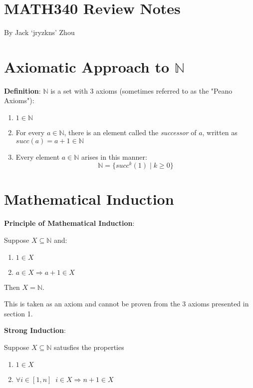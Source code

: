 \documentclass{article}
\begin{document}
\begin{multicols*}{2}

\section*{MATH340 Review Notes}

By Jack `jryzkns' Zhou

\section{Axiomatic Approach to $\mathbb{N}$}

\textbf{Definition}: $\mathbb{N}$ is a set with 3 axioms (sometimes referred to as the "Peano Axioms"):

\begin{enumerate}
    \item $1 \in \mathbb{N}$
    \item For every $a \in \mathbb{N}$, there is an element called the \textit{successor} of $a$, written as $succ(a) = a+1 \in \mathbb{N}$
    \item Every element $a \in \mathbb{N}$ arises in this manner: \[\mathbb{N} = \{succ^{k}(1) \; | \; k \geq 0\}\]
\end{enumerate}

\section{Mathematical Induction}

\textbf{Principle of Mathematical Induction}:

Suppose $X \subseteq \mathbb{N}$ and:
\begin{enumerate}
    \item $1 \in X$
    \item $a \in X \Rightarrow a+1 \in X$
\end{enumerate}
Then $X = \mathbb{N}$.

This is taken as an axiom and cannot be proven from the 3 axioms presented in section 1.

\textbf{Strong Induction}:

Suppose $X \subseteq \mathbb{N}$ satusfies the properties

\begin{enumerate}
    \item $1 \in X$
    \item $\forall i \in [1,n] \;\; i \in X \Rightarrow n+1 \in X$

\end{enumerate}


\end{multicols*}
\end{document}
